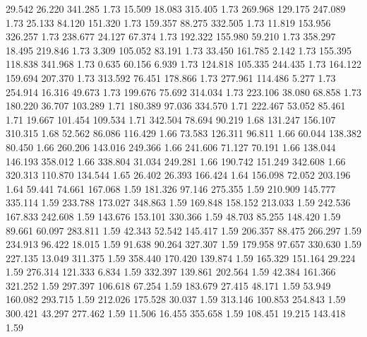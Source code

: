   29.542   26.220  341.285         1.73
  15.509   18.083  315.405         1.73
 269.968  129.175  247.089         1.73
  25.133   84.120  151.320         1.73
 159.357   88.275  332.505         1.73
  11.819  153.956  326.257         1.73
 238.677   24.127   67.374         1.73
 192.322  155.980   59.210         1.73
 358.297   18.495  219.846         1.73
   3.309  105.052   83.191         1.73
  33.450  161.785    2.142         1.73
 155.395  118.838  341.968         1.73
   0.635   60.156    6.939         1.73
 124.818  105.335  244.435         1.73
 164.122  159.694  207.370         1.73
 313.592   76.451  178.866         1.73
 277.961  114.486    5.277         1.73
 254.914   16.316   49.673         1.73
 199.676   75.692  314.034         1.73
 223.106   38.080   68.858         1.73
 180.220   36.707  103.289         1.71
 180.389   97.036  334.570         1.71
 222.467   53.052   85.461         1.71
  19.667  101.454  109.534         1.71
 342.504   78.694   90.219         1.68
 131.247  156.107  310.315         1.68
  52.562   86.086  116.429         1.66
  73.583  126.311   96.811         1.66
  60.044  138.382   80.450         1.66
 260.206  143.016  249.366         1.66
 241.606   71.127   70.191         1.66
 138.044  146.193  358.012         1.66
 338.804   31.034  249.281         1.66
 190.742  151.249  342.608         1.66
 320.313  110.870  134.544         1.65
  26.402   26.393  166.424         1.64
 156.098   72.052  203.196         1.64
  59.441   74.661  167.068         1.59
 181.326   97.146  275.355         1.59
 210.909  145.777  335.114         1.59
 233.788  173.027  348.863         1.59
 169.848  158.152  213.033         1.59
 242.536  167.833  242.608         1.59
 143.676  153.101  330.366         1.59
  48.703   85.255  148.420         1.59
  89.661   60.097  283.811         1.59
  42.343   52.542  145.417         1.59
 206.357   88.475  266.297         1.59
 234.913   96.422   18.015         1.59
  91.638   90.264  327.307         1.59
 179.958   97.657  330.630         1.59
 227.135   13.049  311.375         1.59
 358.440  170.420  139.874         1.59
 165.329  151.164   29.224         1.59
 276.314  121.333    6.834         1.59
 332.397  139.861  202.564         1.59
  42.384  161.366  321.252         1.59
 297.397  106.618   67.254         1.59
 183.679   27.415   48.171         1.59
  53.949  160.082  293.715         1.59
 212.026  175.528   30.037         1.59
 313.146  100.853  254.843         1.59
 300.421   43.297  277.462         1.59
  11.506   16.455  355.658         1.59
 108.451   19.215  143.418         1.59
